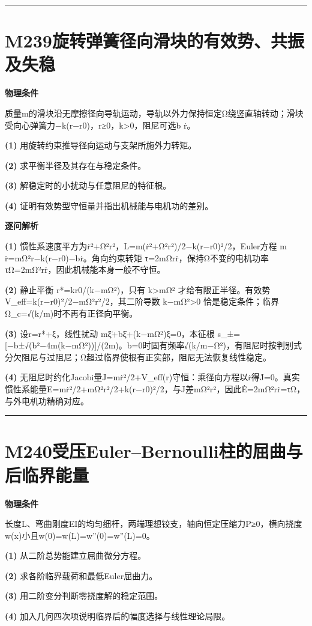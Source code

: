 \documentclass[UTF8,a4paper,11pt,oneside,openany]{ctexbook}
\begin{document}
\par\bigskip\hrule\bigskip
\section*{M239\quad 旋转弹簧径向滑块的有效势、共振及失稳}
\textbf{物理条件}\par 质量m的滑块沿无摩擦径向导轨运动，导轨以外力保持恒定Ω绕竖直轴转动；滑块受向心弹簧力−k(r−r0)，r≥0，k>0，阻尼可选b ṙ。
\par\noindent\textbf{(1)} 用旋转约束推导径向运动与支架所施外力转矩。
\par\noindent\textbf{(2)} 求平衡半径及其存在与稳定条件。
\par\noindent\textbf{(3)} 解稳定时的小扰动与任意阻尼的特征根。
\par\noindent\textbf{(4)} 证明有效势型守恒量并指出机械能与电机功的差别。

\par\medskip\noindent\textbf{逐问解析}
\par\noindent\textbf{(1)} 惯性系速度平方为ṙ²+Ω²r²，L=m(ṙ²+Ω²r²)/2−k(r−r0)²/2，Euler方程 m r̈=mΩ²r−k(r−r0)−bṙ。角向约束转矩 τ=2mΩrṙ，保持Ω不变的电机功率 τΩ=2mΩ²rṙ，因此机械能本身一般不守恒。
\par\noindent\textbf{(2)} 静止平衡 r*=kr0/(k−mΩ²)，只有 k>mΩ² 才给有限正半径。有效势 V\_eff=k(r−r0)²/2−mΩ²r²/2，其二阶导数 k−mΩ²>0 恰是稳定条件；临界Ω\_c=√(k/m)时不再有正径向平衡。
\par\noindent\textbf{(3)} 设r=r*+ξ，线性扰动 mξ̈+bξ̇+(k−mΩ²)ξ=0，本征根 s\_±=[−b±√(b²−4m(k−mΩ²))]/(2m)。b=0时固有频率√(k/m−Ω²)，有阻尼时按判别式分欠阻尼与过阻尼；Ω超过临界使根有正实部，阻尼无法恢复线性稳定。
\par\noindent\textbf{(4)} 无阻尼时约化Jacobi量J=mṙ²/2+V\_eff(r)守恒：乘径向方程以ṙ得J̇=0。真实惯性系能量E=mṙ²/2+mΩ²r²/2+k(r−r0)²/2，与J差mΩ²r²，因此Ė=2mΩ²rṙ=τΩ，与外电机功精确对应。

\par\bigskip\hrule\bigskip
\section*{M240\quad 受压Euler–Bernoulli柱的屈曲与后临界能量}
\textbf{物理条件}\par 长度L、弯曲刚度EI的均匀细杆，两端理想铰支，轴向恒定压缩力P≥0，横向挠度w(x)小且w(0)=w(L)=w''(0)=w''(L)=0。
\par\noindent\textbf{(1)} 从二阶总势能建立屈曲微分方程。
\par\noindent\textbf{(2)} 求各阶临界载荷和最低Euler屈曲力。
\par\noindent\textbf{(3)} 用二阶变分判断零挠度解的稳定范围。
\par\noindent\textbf{(4)} 加入几何四次项说明临界后的幅度选择与线性理论局限。
\end{document}
